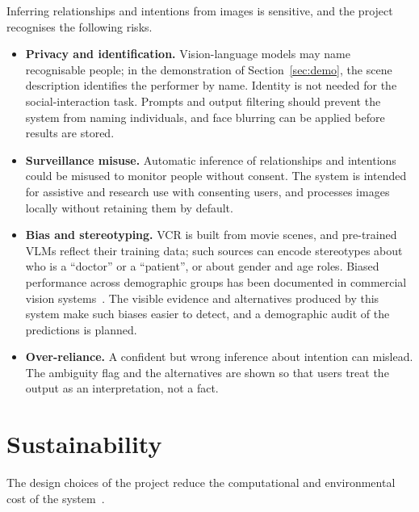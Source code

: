 \documentclass[12pt,a4paper,oneside]{report}
\begin{document}
Inferring relationships and intentions from images is sensitive, and the
project recognises the following risks.

\begin{itemize}[leftmargin=*]
\item \textbf{Privacy and identification.} Vision-language models may name
  recognisable people; in the demonstration of Section~\ref{sec:demo}, the
  scene description identifies the performer by name. Identity is not needed
  for the social-interaction task. Prompts and output filtering should prevent
  the system from naming individuals, and face blurring can be applied before
  results are stored.
\item \textbf{Surveillance misuse.} Automatic inference of relationships and
  intentions could be misused to monitor people without consent. The system is
  intended for assistive and research use with consenting users, and processes
  images locally without retaining them by default.
\item \textbf{Bias and stereotyping.} VCR is built from movie scenes, and
  pre-trained VLMs reflect their training data; such sources can encode
  stereotypes about who is a ``doctor'' or a ``patient'', or about gender and
  age roles. Biased performance across demographic groups has been documented
  in commercial vision systems~\cite{buolamwini2018gender}. The visible
  evidence and alternatives produced by this system make such biases easier to
  detect, and a demographic audit of the predictions is planned.
\item \textbf{Over-reliance.} A confident but wrong inference about intention
  can mislead. The ambiguity flag and the alternatives are shown so that users
  treat the output as an interpretation, not a fact.
\end{itemize}

\section{Sustainability}

The design choices of the project reduce the computational and environmental
cost of the system~\cite{strubell2019energy}.
\end{document}
